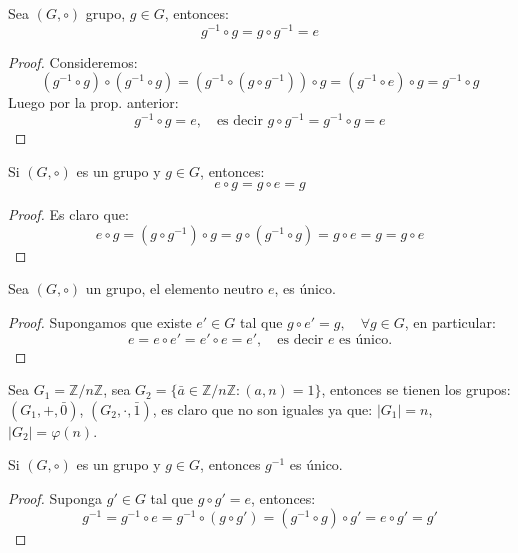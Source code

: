 \begin{prop}
	Sea $(G, \circ)$ grupo, $g \in G$, entonces:
	\begin{equation*}
		g^{-1} \circ g = g \circ g^{-1} = e
	\end{equation*}
\end{prop}

\begin{proof}
	Consideremos:
	\begin{equation*}
		(g^{-1} \circ g) \circ (g^{-1} \circ g) = (g^{-1} \circ (g \circ g^{-1})) \circ g = (g^{-1} \circ e) \circ g = g^{-1} \circ g
	\end{equation*}
	Luego por la prop. anterior:
	\begin{equation*}
		g^{-1} \circ g = e, \quad \text{es decir } g \circ g^{-1} = g^{-1} \circ g = e
	\end{equation*}
\end{proof}

\begin{prop}
	Si $(G, \circ)$ es un grupo y $g \in G$, entonces:
	\begin{equation*}
		e \circ g = g \circ e = g
	\end{equation*}
\end{prop}

\begin{proof}
	Es claro que:
	\begin{equation*}
		e \circ g = (g \circ g^{-1}) \circ g = g \circ (g^{-1} \circ g) = g \circ e = g = g \circ e
	\end{equation*}
\end{proof}

\begin{prop}
	Sea $(G, \circ)$ un grupo, el elemento neutro $e$, es único.
\end{prop}

\begin{proof}
	Supongamos que existe $e' \in G$ tal que $g \circ e' = g, \quad \forall g \in G$, en particular:
	\begin{equation*}
		e = e \circ e' = e' \circ e = e', \quad \text{es decir } e \text{ es único.}
	\end{equation*}
\end{proof}

\begin{eje}
	Sea $G_1 = \mathbb{Z}/n\mathbb{Z}$, sea $G_2 = \{\bar{a} \in \mathbb{Z}/n\mathbb{Z} : (a, n)=1\}$, entonces se tienen los grupos: $(G_1, +, \bar{0})$, $(G_2, \cdot, \bar{1})$, es claro que no son iguales ya que: $|G_1| = n$, $|G_2| = \varphi(n)$.
\end{eje}

\begin{prop}
	Si $(G, \circ)$ es un grupo y $g \in G$, entonces $g^{-1}$ es único.
\end{prop}

\begin{proof}
	Suponga $g' \in G$ tal que $g \circ g' = e$, entonces:
	\begin{equation*}
		g^{-1} = g^{-1} \circ e = g^{-1} \circ (g \circ g') = (g^{-1} \circ g) \circ g' = e \circ g' = g'
	\end{equation*}
\end{proof}
